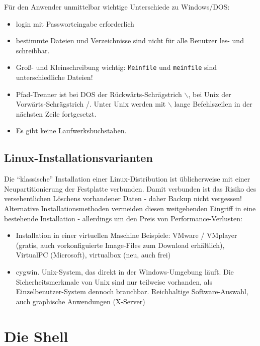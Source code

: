 \documentclass[11pt]{article}
\begin{document}
Für den Anwender unmittelbar wichtige Unterschiede zu Windows/DOS:
\begin{itemize}
\item login mit Passworteingabe erforderlich
\item bestimmte Dateien und Verzeichnisse sind  nicht für alle Benutzer
les- und schreibbar.
\item Groß- und Kleinschreibung wichtig: \texttt{Meinfile} und
\texttt{meinfile} sind unterschiedliche Dateien!
\item Pfad-Trenner ist bei DOS der Rückwärts-Schrägstrich $ \backslash
$, bei Unix der Vorwärts-Schrägstrich /. Unter Unix werden mit $
\backslash $ lange Befehlszeilen in der nächsten Zeile fortgesetzt.
\item Es gibt keine Laufwerksbuchstaben.
\end{itemize}

\subsection{Linux-Installationsvarianten}
Die ``klassische'' Installation einer Linux-Distribution ist üblicherweise
mit einer Neupartitionierung der Festplatte verbunden. Damit verbunden
ist das Risiko des versehentlichen Löschens vorhandener Daten - daher
Backup nicht vergessen! Alternative Installationsmethoden vermeiden
diesen weitgehenden Eingriff in eine bestehende Installation -
allerdings  um den Preis von Performance-Verlusten:

\begin{itemize}
\item{Installation in einer virtuellen Maschine}
Beispiele: VMware / VMplayer (gratis, auch vorkonfiguierte Image-Files
zum Download erhältlich), VirtualPC (Microsoft), virtualbox (neu, auch
frei)

\item{cygwin}.
Unix-System, das direkt in der Windows-Umgebung läuft. Die
Sicherheitsmerkmale von Unix sind nur teilweise vorhanden, als
Einzelbenutzer-System dennoch brauchbar. Reichhaltige Software-Auswahl,
auch graphische Anwendungen (X-Server) 
\end{itemize}

\section{Die Shell}
\end{document}

